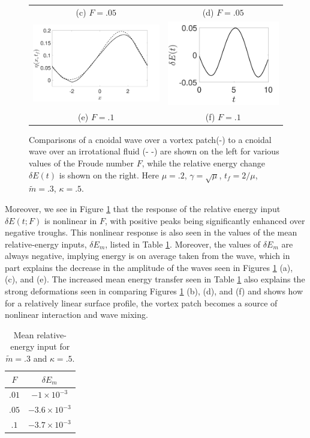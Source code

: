 \documentclass[a4paper,11pt]{article}
\begin{document}
\begin{figure}
\begin{tabular}{cc}
(c)  $F=.05$ & (d)  $F=.05$\\
\includegraphics[width=.45\textwidth]{profiles_wm_10_modu_pt3} & \includegraphics[width=.4\textwidth]{energy_wm_10_modu_pt3}\\
(e)  $F=.1$ & (f)  $F=.1$
\end{tabular}
\caption{Comparisons of a cnoidal wave over a vortex patch(-) to a cnoidal wave over an irrotational fluid (- -) are shown on the left for various values of the Froude number $F$, while the relative energy change $\delta E(t)$ is shown on the right.  Here $\mu=.2$, $\gamma=\sqrt{\mu}$, $t_{f}=2/\mu$, $\tilde{m}=.3$, $\kappa = .5$.}
\label{fig:lowsolwave}
\end{figure}

Moreover, we see in Figure \ref{fig:lowsolwave} that the response of the relative energy input $\delta E(t;F)$ is nonlinear in $F$, with positive peaks being significantly enhanced over negative troughs.  This nonlinear response is also seen in the values of the mean relative-energy inputs, $\delta E_{m}$, listed in Table \ref{tab:lowsolmean}.  Moreover, the values of $\delta E_{m}$ are always negative, implying energy is on average taken from the wave, which in part explains the decrease in the amplitude of the waves seen in Figures \ref{fig:lowsolwave} (a), (c), and (e).  The increased mean energy transfer seen in Table \ref{tab:lowsolmean} also explains the strong deformations seen in comparing Figures \ref{fig:lowsolwave} (b), (d), and (f) and shows how for a relatively linear surface profile, the vortex patch becomes a source of nonlinear interaction and wave mixing.    
\begin{table}
\centering
\begin{tabular}{c|c}
$F$ & $\delta E_{m}$ \\
\hline
$.01$ & $-1\times 10^{-3}$\\
$.05$ & $-3.6\times 10^{-3}$\\
$.1$ & $-3.7\times 10^{-3}$
\end{tabular}
\caption{Mean relative-energy input for $\tilde{m}=.3$ and $\kappa=.5$.}
\label{tab:lowsolmean}
\end{table}
\end{document}
